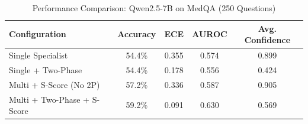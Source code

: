\begin{table}[h]
\centering
\caption{Performance Comparison: Qwen2.5-7B on MedQA (250 Questions)}
\label{tab:paper1_results}
\begin{tabular}{lcccc}
\hline
Configuration & Accuracy & ECE & AUROC & Avg. Confidence \\
\hline
Single Specialist & 54.4\% & 0.355 & 0.574 & 0.899 \\
Single + Two-Phase & 54.4\% & 0.178 & 0.556 & 0.424 \\
Multi + S-Score (No 2P) & 57.2\% & 0.336 & 0.587 & 0.905 \\
Multi + Two-Phase + S-Score & 59.2\% & 0.091 & 0.630 & 0.569 \\
\hline
\end{tabular}
\end{table}